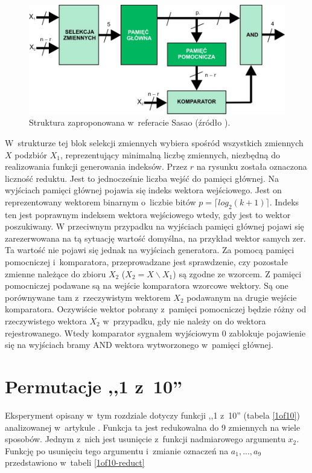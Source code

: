 \begin{figure}[H]
\centering
\includegraphics[width = 13cm]{chapter04/sasao-structure.jpg}
\caption{Struktura zaproponowana w~referacie Sasao (źródło \cite{sasao-workshop}).}
\label{fig:sasao-structure}
\end{figure}

W~strukturze tej blok selekcji zmiennych wybiera spośród wszystkich zmiennych $X$ podzbiór $X_1$,
reprezentujący minimalną liczbę zmiennych,
niezbędną do realizowania funkcji generowania indeksów.
Przez $r$ na rysunku została oznaczona liczność reduktu.
Jest to jednocześnie liczba wejść do pamięci głównej.
Na wyjściach pamięci głównej pojawia się indeks wektora wejściowego. %
Jest on reprezentowany wektorem binarnym o~liczbie bitów $p = \lceil log_2 (k+1)\rceil$.
Indeks ten jest poprawnym indeksem wektora wejściowego wtedy,
gdy jest to wektor poszukiwany.
W przeciwnym przypadku na wyjściach pamięci głównej pojawi się zarezerwowana na tą sytuację wartość domyślna,
na przykład wektor samych zer.
Ta wartość nie pojawi się jednak na wyjściach generatora.
Za pomocą pamięci pomocniczej i~komparatora,
przeprowadzane jest sprawdzenie,
czy pozostałe zmienne należące do zbioru $X_2$ ($X_2 = X \backslash X_1$) są zgodne ze wzorcem.
Z pamięci pomocniczej podawane są na wejście komparatora wzorcowe wektory.
Są one porównywane tam z~rzeczywistym wektorem $X_2$ podawanym na drugie wejście komparatora.
Oczywiście wektor pobrany z~pamięci pomocniczej będzie różny od rzeczywistego wektora $X_2$ w~przypadku,
gdy nie należy on do wektora rejestrowanego.
Wtedy komparator sygnałem wyjściowym 0 zablokuje pojawienie się na wyjściach bramy AND wektora wytworzonego w~pamięci głównej.

\section{Permutacje ,,1 z~10''}

Eksperyment opisany w~tym rozdziale dotyczy funkcji ,,1 z~10'' (tabela \ref{1of10}) analizowanej w~artykule \cite{sasao-s-min}.
Funkcja ta jest redukowalna do 9 zmiennych na wiele sposobów.
Jednym z~nich jest usunięcie z~funkcji nadmiarowego argumentu $x_2$.
Funkcję po usunięciu tego argumentu i~zmianie oznaczeń na $a_1, ..., a_9$ przedstawiono w~tabeli \ref{1of10-reduct}

